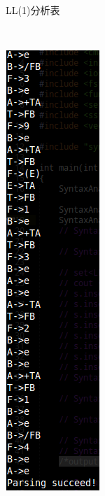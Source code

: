 \documentclass{article}
\begin{document}
\begin{CJK*}{UTF8}{gbsn}
\begin{figure}
\begin{subfigure}[b]{0.3\textwidth}
                \caption{LL(1)分析表}
                \label{fig:ll1}
        \end{subfigure}%
        ~ %
        \begin{subfigure}[b]{0.25\textwidth}
                \includegraphics[width=\textwidth]{ll1yes.png}

\end{subfigure}
\end{figure}
\end{CJK*}
\end{document}
